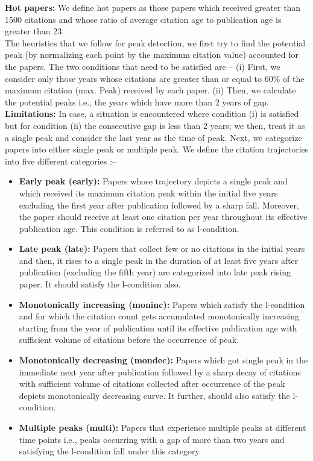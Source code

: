 \textbf{Hot papers:} We define hot papers as those papers which received greater than 1500 citations and whose ratio of average citation age to publication age is greater than 23.\\

The heuristics that we follow for peak detection, we first try to find the potential peak (by normalizing each point by the maximum citation value) accounted for the papers. The two conditions that need to be satisfied are – (i) First, we consider only those years whose citations are greater than or equal to 60\% of the maximum citation (max. Peak) received by each paper. (ii) Then, we calculate the potential peaks i.e., the years which have more than 2 years of gap.\\
\textbf{Limitations:} In case, a situation is encountered where condition (i) is satisfied but for condition (ii) the consecutive gap is less than 2 years; we then, treat it as a single peak and consider the last year as the time of peak. Next, we categorize papers into either single peak or multiple peak. We define the citation trajectories into five different categories :–\\
\begin{itemize}
    \item \textbf{Early peak (early):} Papers whose trajectory depicts a single peak and which received its maximum citation peak within the initial five years excluding the first year after publication followed by a sharp fall. Moreover, the paper should receive at least one citation per year throughout its effective publication age. This condition is referred to as l-condition.
    \item \textbf{Late peak (late):} Papers that collect few or no citations in the initial years and then, it rises to a single peak in the duration of at least five years after publication (excluding the fifth year) are categorized into late peak rising paper. It should satisfy the l-condition also.
    \item \textbf{Monotonically increasing (moninc):} Papers which satisfy the l-condition and for which the citation count gets accumulated monotonically increasing starting from the year of publication until its effective publication age with sufficient volume of citations before the occurrence of peak.
    \item \textbf{Monotonically decreasing (mondec):} Papers which got single peak in the immediate next year after publication followed by a sharp decay of citations with sufficient volume of citations collected after occurrence of the peak depicts monotonically decreasing curve. It further, should also satisfy the l-condition.
    \item \textbf{Multiple peaks (multi):} Papers that experience multiple peaks at different time points i.e., peaks occurring with a gap of more than two years and satisfying the l-condition fall under this category.
\end{itemize}

